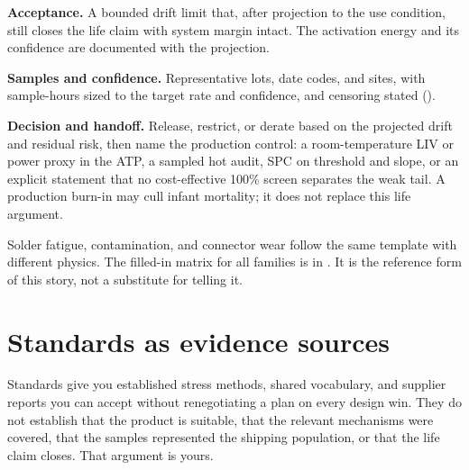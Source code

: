 \textbf{Acceptance.} A bounded drift limit that, after projection to the use
condition, still closes the life claim with system margin intact. The
activation energy and its confidence are documented with the projection.

\textbf{Samples and confidence.} Representative lots, date codes, and sites,
with sample-hours sized to the target rate and confidence, and censoring stated
().

\textbf{Decision and handoff.} Release, restrict, or derate based on the
projected drift and residual risk, then name the production control:
a room-temperature LIV or power proxy in the ATP, a sampled hot audit, SPC on
threshold and slope, or an explicit statement that no cost-effective 100\%
screen separates the weak tail. A production burn-in may cull infant mortality;
it does not replace this life argument.

Solder fatigue, contamination, and connector wear follow the same template with
different physics. The filled-in matrix for all families is
 in . It is the
reference form of this story, not a substitute for telling it.

\section{Standards as evidence sources}
\label{sec:qual-standards}

Standards give you established stress methods, shared vocabulary, and supplier
reports you can accept without renegotiating a plan on every design win. They
do not establish that the product is suitable, that the relevant mechanisms
were covered, that the samples represented the shipping population, or that the
life claim closes. That argument is yours.

